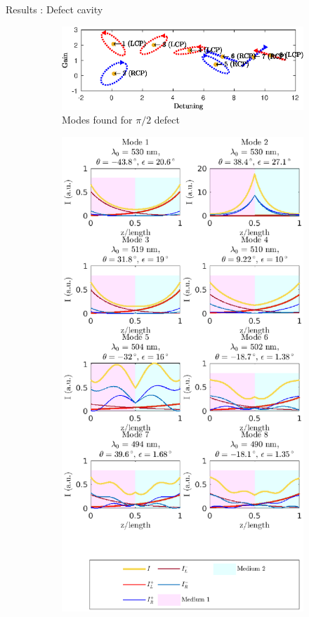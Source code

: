 \documentclass[aspectratio=169]{beamer}
\begin{document}
\begin{frame}{Results : Defect cavity}
	\begin{figure}
		\centering
		\begin{subfigure}{0.49\linewidth}
			\includegraphics[width=\linewidth]{plots/defect/modes_found}
			\caption{Modes found for $\pi/2$ defect}
		\end{subfigure}
		\begin{subfigure}{0.49\linewidth}
			\centering
			\includegraphics[height=\textheight]{plots/defect/intensity_distribution}

\end{subfigure}
\end{figure}
\end{frame}
\end{document}
